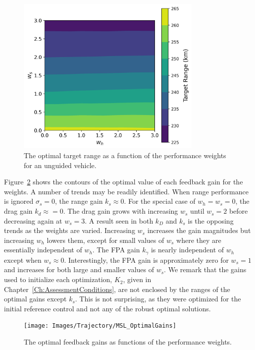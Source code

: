 \begin{figure}[h!]
	\centering
	\includegraphics[width=0.8\textwidth]{Images/OpenLoop_TargetRange}
	\caption{The optimal target range as a function of the performance weights for an unguided vehicle.}
	\label{Fig:MCTargetRangeOpenLoop}
\end{figure}

Figure~\ref{Fig:MCOptimalGains} shows the contours of the optimal value of each feedback gain for the weights. A number of trends may be readily identified. When range performance is ignored $\sigma_s=0$, the range gain $k_s\approx 0$. For the special case of $w_h=w_s=0$, the drag gain $k_d\approx=0$. The drag gain grows with increasing $w_s$ until $w_s=2$ before decreasing again at $w_s=3$. 
A result seen in both $k_D$ and $k_s$ is the opposing trends as the weights are varied. Increasing $w_s$ increases the gain magnitudes but increasing $w_h$ lowers them, except for small values of $w_s$ where they are essentially independent of $w_h$. 
The FPA gain $k_\gamma$ is nearly independent of $w_h$ except when $w_s\approx0$. Interestingly, the FPA gain is approximately zero for $w_s=1$ and increases for both large and smaller values of $w_s$. We remark that the gains used to initialize each optimization, $K_2$, given in Chapter~\ref{Ch:AssessmentConditions}, are not enclosed by the ranges of the optimal gains except $k_s$. This is not surprising, as they were optimized for the initial reference control and not any of the robust optimal solutions. 
\begin{figure}[h!]
	\centering
	\texttt{[image: Images/Trajectory/MSL\_OptimalGains]}
	\caption{The optimal feedback gains as functions of the performance weights.}
	\label{Fig:MCOptimalGains}
\end{figure}

